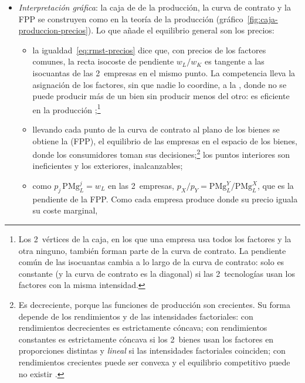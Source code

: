 \documentclass[11pt]{article}
\begin{document}
\begin{itemize}
\begin{enumerate}
  \item homogéneas de grado 0~en $(p_j,\vect{w})$: el problema no cambia si todos los precios se multiplican por la misma constante;
  \item monótonas: la oferta es no decreciente en su precio y la demanda de cada factor, no creciente en el suyo (lema de ) .
  \end{enumerate}
\item \emph{Interpretación gráfica}: la caja de  de la producción, la curva de contrato y la FPP se construyen como en la teoría de la producción  (gráfico~\ref{fig:caja-produccion-precios}). Lo que añade el equilibrio general son los precios:
  \begin{itemize}
  \item la igualdad~\eqref{eq:rmst-precios} dice que, con precios de los factores comunes, la recta isocoste de pendiente $w_L/w_K$ es tangente a las isocuantas de las 2~empresas en el mismo punto. La competencia lleva la asignación de los factores, sin que nadie lo coordine, a la , donde no se puede producir más de un bien sin producir menos del otro: es eficiente en la producción ;\footnote{Los 2~vértices de la caja, en los que una empresa usa todos los factores y la otra ninguno, también forman parte de la curva de contrato. La pendiente común de las isocuantas cambia a lo largo de la curva de contrato: solo es constante (y la curva de contrato es la diagonal) si las 2~tecnologías usan los factores con la misma intensidad.}
  \item llevando cada punto de la curva de contrato al plano de los bienes se obtiene la  (FPP), el equilibrio de las empresas en el espacio de los bienes, donde los consumidores toman sus decisiones;\footnote{Es decreciente, porque las funciones de producción son crecientes. Su forma depende de los rendimientos y de las intensidades factoriales: con rendimientos decrecientes es estrictamente cóncava; con rendimientos constantes es estrictamente cóncava si los 2~bienes usan los factores en proporciones distintas y \emph{lineal} si las intensidades factoriales coinciden; con rendimientos crecientes puede ser convexa y el equilibrio competitivo puede no existir .} los puntos interiores son ineficientes y los exteriores, inalcanzables;
  \item como $p_j\,\mathrm{PMg}^j_L=w_L$ en las 2~empresas, $p_X/p_Y=\mathrm{PMg}^Y_L/\mathrm{PMg}^X_L$, que es la pendiente de la FPP. Como cada empresa produce donde su precio iguala su coste marginal,

\end{itemize}
\end{itemize}
\end{document}
